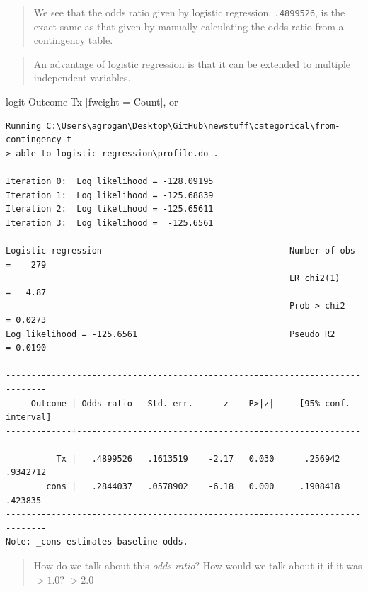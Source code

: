 \documentclass[
  letterpaper,
  DIV=11,
  numbers=noendperiod]{scrartcl}
\newenvironment{Shaded}{\begin{snugshade}}{\end{snugshade}}
\newcommand{\KeywordTok}[1]{\textcolor[rgb]{0.00,0.23,0.31}{#1}}
\newcommand{\NormalTok}[1]{\textcolor[rgb]{0.00,0.23,0.31}{#1}}
\begin{document}
\begin{quote}
We see that the odds ratio given by logistic regression,
\texttt{.4899526}, is the exact same as that given by manually
calculating the odds ratio from a contingency table.
\end{quote}

\begin{quote}
An advantage of logistic regression is that it can be extended to
multiple independent variables.
\end{quote}

\begin{Shaded}
\begin{Highlighting}[]

\KeywordTok{logit}\NormalTok{ Outcome Tx [}\KeywordTok{fweight}\NormalTok{ = Count], }\KeywordTok{or}
\end{Highlighting}
\end{Shaded}

\begin{verbatim}
Running C:\Users\agrogan\Desktop\GitHub\newstuff\categorical\from-contingency-t
> able-to-logistic-regression\profile.do . 

Iteration 0:  Log likelihood = -128.09195  
Iteration 1:  Log likelihood = -125.68839  
Iteration 2:  Log likelihood = -125.65611  
Iteration 3:  Log likelihood =  -125.6561  

Logistic regression                                     Number of obs =    279
                                                        LR chi2(1)    =   4.87
                                                        Prob > chi2   = 0.0273
Log likelihood = -125.6561                              Pseudo R2     = 0.0190

------------------------------------------------------------------------------
     Outcome | Odds ratio   Std. err.      z    P>|z|     [95% conf. interval]
-------------+----------------------------------------------------------------
          Tx |   .4899526   .1613519    -2.17   0.030      .256942    .9342712
       _cons |   .2844037   .0578902    -6.18   0.000     .1908418     .423835
------------------------------------------------------------------------------
Note: _cons estimates baseline odds.
\end{verbatim}

\begin{quote}
How do we talk about this \emph{odds ratio}? How would we talk about it
if it was \(> 1.0\)? \(> 2.0\)
\end{quote}
\end{document}
